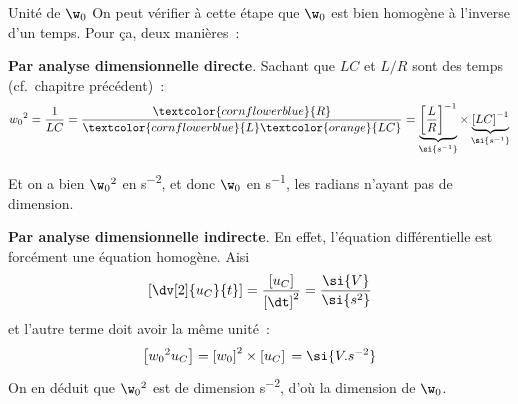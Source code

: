 \documentclass[../main/main.tex]{subfiles}
\begin{document}
\begin{rema}[label=rema:unité]{Unité de $\w_0$}
    On peut vérifier à cette étape que $\w_0$ est bien homogène à l'inverse d'un
    temps. Pour ça, deux manières~:

    \begin{remaside}
        \textbf{Par analyse dimensionnelle directe}. Sachant que $LC$ et $L/R$
        sont des temps (cf.\ chapitre précédent)~:
        \begin{align*}
            w_0{}^2 = \frac{1}{LC} =
                \frac{\textcolor{cornflowerblue}{R}}
                {\textcolor{cornflowerblue}{L}\textcolor{orange}{LC}}
                = \underbrace{\left[ \frac{L}{R}
                \right]^{-1}}_{\si{s^{-1}}}\times
                \underbrace{\left[ LC \right]^{-1}}_{\si{s^{-1}}}
        \end{align*}

        Et on a bien $\w_0{}^2$ en \si{s^{-2}}, et donc $\w_0$ en \si{s^{-1}},
        les radians n'ayant pas de dimension.

        \tcblower
        \textbf{Par analyse dimensionnelle indirecte}. En effet, l'équation
        différentielle est forcément une équation homogène. Aisi
        \begin{equation*}
            \left[ \dv[2]{u_C}{t} \right] =
                \frac{\left[u_C\right]}{\left[\dt\right]^2}\\
                                          = \frac{\si{V}}{\si{s^2}}
        \end{equation*}
        et l'autre terme doit avoir la même unité~:
        \begin{equation*}
            \left[ w_0{}^2u_C \right] = \left[ w_0 \right]^2\times \left[
            u_C \right]\\
                                      = \si{V.s^{-2}}
        \end{equation*}
        On en déduit que $\w_0{}^2$ est de dimension \si{s^{-2}}, d'où la
        dimension de $\w_0$.
    \end{remaside}
\end{rema}
\end{document}
